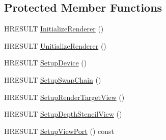 \subsection*{Protected Member Functions}
\begin{DoxyCompactItemize}
\item 
H\+R\+E\+S\+U\+LT \hyperlink{classmage_1_1_renderer_aafed50e7e14ca597541c091941351929}{Initialize\+Renderer} ()
\item 
H\+R\+E\+S\+U\+LT \hyperlink{classmage_1_1_renderer_a308beaf67b11128f02e87778b6a9c3c7}{Unitialize\+Renderer} ()
\item 
H\+R\+E\+S\+U\+LT \hyperlink{classmage_1_1_renderer_a4ee0187fb63587a219798523fb8cb7a6}{Setup\+Device} ()
\item 
H\+R\+E\+S\+U\+LT \hyperlink{classmage_1_1_renderer_af2aa545594936261bf2639e4e0814a83}{Setup\+Swap\+Chain} ()
\item 
H\+R\+E\+S\+U\+LT \hyperlink{classmage_1_1_renderer_afe99715a4ae6432ba561dcab048f79b4}{Setup\+Render\+Target\+View} ()
\item 
H\+R\+E\+S\+U\+LT \hyperlink{classmage_1_1_renderer_a95a34b64e815b0e5e95ce539bbd0f5a3}{Setup\+Depth\+Stencil\+View} ()
\item 
H\+R\+E\+S\+U\+LT \hyperlink{classmage_1_1_renderer_a18937e12912fe18b935893dc6502b92f}{Setup\+View\+Port} () const
\end{DoxyCompactItemize}

